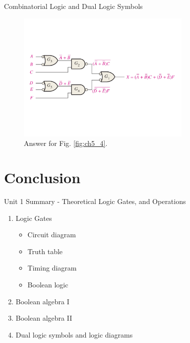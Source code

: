 \documentclass{beamer}
\begin{document}
\begin{frame}{Combinatorial Logic and Dual Logic Symbols}
\begin{figure}
\centering
\includegraphics[width=0.75\textwidth,trim=0cm 4cm 0.5cm 4cm,clip=true]{figures/ch5_4.pdf}
\caption{\label{fig:ch5_5} Answer for Fig. \ref{fig:ch5_4}.}
\end{figure}
\end{frame}

\section{Conclusion}

\begin{frame}{Unit 1 Summary - Theoretical Logic Gates, and Operations}
\begin{enumerate}
\item Logic Gates
\begin{itemize}
\item Circuit diagram
\item Truth table
\item Timing diagram
\item Boolean logic
\end{itemize}
\item \alert{Boolean algebra I}
\item \alert{Boolean algebra II}
\item Dual logic symbols and logic diagrams
\end{enumerate}
\end{frame}
\end{document}
